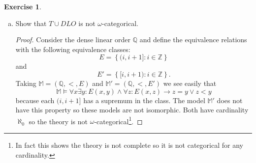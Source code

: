 \documentclass{article}
\renewcommand{\qedsymbol}{\raisebox{-0.5cm}{}}
\newcommand{\Z}{\mathbb{Z}}
\newcommand{\Q}{\mathbb{Q}}
\newcommand{\setwith}[2]{\left\{#1:#2\right\}}
\newenvironment{solution}{\begin{proof}[Solution]\renewcommand\qedsymbol{}}{\end{proof}}
\theoremstyle{definition}
\newtheorem{question}{Exercise}
\begin{document}
\begin{question}
\begin{enumerate}[(a)]
\begin{solution}
                  For models of cardinality \(\aleph_{1}\) the picture becomes a
                  bit more complex. If there are \(\kappa\) equivalence classes
                  of cardinality \(\aleph_{0}\) and \(\lambda\) of cardinality
                  \(\aleph_{1}\) the model has cardinality
                  \(\kappa\cdot\aleph_{0}+\lambda\cdot\aleph_{1}\) with
                  \(\kappa,\lambda\leq\aleph_{1}\) and \(\lambda\geq1\) or
                  \(\kappa=\aleph_{1}\). We compute the cardinality of the set
                  of such tuples \((\kappa,\lambda)\).

                  If \(\kappa=\aleph_{1}\) then \(\lambda\) can be anything
                  giving \(\aleph_{0}\) many of such tuples. If
                  \(\kappa<\aleph_{1}\), then \(1\leq\lambda\leq\aleph_{1}\) so
                  there are \(\aleph_{0}\cdot\aleph_{0}=\aleph_{0}\) many tuples
                  of this shape.

                  This means that in total there are
                  \(\aleph_{0}=\aleph_{0}+\aleph_{0}\) many models of \(T\) of
                  cardinality \(\aleph_{1}\) up to isomorphism.
              \end{solution}

        \item Show that \(T\cup DLO\) is not \(\omega\)-categorical.

              \begin{proof}
                  Consider the dense linear order \(\Q\) and define the
                  equivalence relations with the following equivalence classes:
                  \[
                      E=\setwith{(i,i+1]}{i\in\Z}
                  \]
                  and
                  \[
                      E'=\setwith{[i,i+1)}{i\in\Z}.
                  \]
                  Taking \(\mathbb{M}=(\Q,<,E)\) and \(\mathbb{M}'=(\Q,<,E')\)
                  we see easily that
                  \[
                      \mathbb{M}\models\forall x\exists y:E(x,y)\wedge\forall z:E(x,z)\to z=y\vee z<y
                  \]
                  because each \((i,i+1]\) has a supremum in the class. The
                  model \(\mathbb{M}'\) does not have this property so these
                  models are not isomorphic. Both have cardinality
                  \(\aleph_{0}\) so the theory is not
                  \(\omega\)-categorical\footnote{In fact this shows the theory
                      is not complete so it is not categorical for any cardinality.}.
              \end{proof}
    \end{enumerate}
\end{question}
\end{document}
